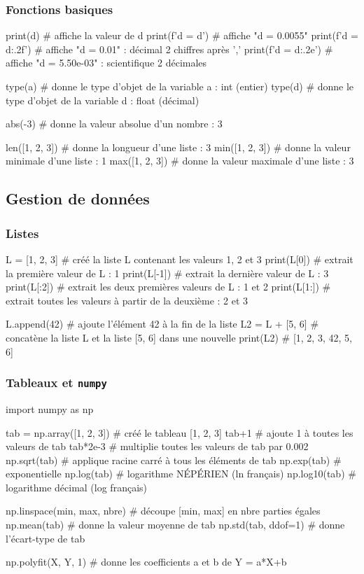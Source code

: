 \documentclass[a4paper, 12pt, garamond]{book}
\begin{document}
\subsubsection{Fonctions basiques}
\begin{python}
print(d)               # affiche la valeur de d
print(f'd = {d}')      # affiche "d = 0.0055"
print(f'd = {d:.2f}')  # affiche "d = 0.01" : décimal 2 chiffres après ','
print(f'd = {d:.2e}')  # affiche "d = 5.50e-03" : scientifique 2 décimales

type(a)   # donne le type d'objet de la variable a : int (entier)
type(d)   # donne le type d'objet de la variable d : float (décimal)

abs(-3)         # donne la valeur absolue d'un nombre : 3

len([1, 2, 3])  # donne la longueur d'une liste : 3
min([1, 2, 3])  # donne la valeur minimale d'une liste : 1
max([1, 2, 3])  # donne la valeur maximale d'une liste : 3
\end{python}

\subsection{Gestion de données}
\subsubsection{Listes}

\begin{python}
L = [1, 2, 3]  # créé la liste L contenant les valeurs 1, 2 et 3
print(L[0])    # extrait la première valeur de L : 1
print(L[-1])   # extrait la dernière valeur de L : 3
print(L[:2])   # extrait les deux premières valeurs de L : 1 et 2
print(L[1:])   # extrait toutes les valeurs à partir de la deuxième : 2 et 3

L.append(42)    # ajoute l'élément 42 à la fin de la liste
L2 = L + [5, 6] # concatène la liste L et la liste [5, 6] dans une nouvelle
print(L2)       # [1, 2, 3, 42, 5, 6]
\end{python}

\subsubsection{Tableaux et \texttt{numpy}}
\begin{python}
import numpy as np

tab = np.array([1, 2, 3])  # créé le tableau [1, 2, 3]
tab+1                      # ajoute 1 à toutes les valeurs de tab
tab*2e-3                   # multiplie toutes les valeurs de tab par 0.002
np.sqrt(tab)               # applique racine carré à tous les éléments de tab
np.exp(tab)                # exponentielle
np.log(tab)                # logarithme NÉPÉRIEN (ln français)
np.log10(tab)              # logarithme décimal (log français)

np.linspace(min, max, nbre) # découpe [min, max] en nbre parties égales
np.mean(tab)                # donne la valeur moyenne de tab
np.std(tab, ddof=1)         # donne l'écart-type de tab

np.polyfit(X, Y, 1)         # donne les coefficients a et b de Y = a*X+b
\end{python}
\end{document}
